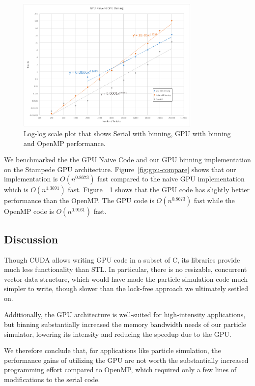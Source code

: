 \documentclass[12pt]{article}
\begin{document}
\begin{figure}
  \centering
  \includegraphics[width=0.8\textwidth]{graphs/serial_openmp_gpu.png}
  \caption{Log-log scale plot that shows Serial with binning, GPU with binning and OpenMP performance.}
  \label{fig:gpu-all}
\end{figure}

We benchmarked the the GPU Naive Code and our GPU binning implementation on the Stampede GPU architecture. Figure~\ref{fig:gpu-compare} shows that our implementation is $O(n^{0.8673})$ fast compared to the naive GPU implementation which is $O(n^{1.3691})$ fast. Figure~~\ref{fig:gpu-all} shows that the GPU code has slightly better performance than the OpenMP. The GPU code is $O(n^{0.8673})$ fast while the OpenMP code is $O(n^{0.9161})$ fast. 

\subsection{Discussion}

Though CUDA allows writing GPU code in a subset of C, its libraries provide much less functionality than STL. In particular, there is no resizable, concurrent vector data structure, which would have made the particle simulation code much simpler to write, though slower than the lock-free approach we ultimately settled on.

Additionally, the GPU architecture is well-suited for high-intensity applications, but binning substantially increased the memory bandwidth needs of our particle simulator, lowering its intensity and reducing the speedup due to the GPU.

We therefore conclude that, for applications like particle simulation, the performance gains of utilizing the GPU are not worth the substantially increased programming effort compared to OpenMP, which required only a few lines of modifications to the serial code.


%
\end{document}
